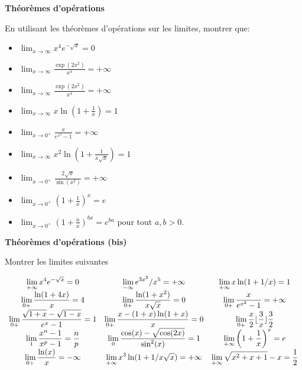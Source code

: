 \documentclass[a4paper,12pt]{article}
\newenvironment{disarray}%
 {\everymath{\displaystyle\everymath{}}\array}%
 {\endarray}
\begin{document}
\Exo \textbf{Théorèmes d'opérations}

En utilisant les théorèmes d'opérations sur les limites, montrer que:

\begin{itemize}
\item $\displaystyle \lim_{x \to \infty} x^4e^{-\sqrt{x}} = 0$
\item $\displaystyle \lim_{x \to \infty} \frac{\exp(2x^2)}{x^4} = +\infty$
\item $\displaystyle \lim_{x \to \infty} \frac{\exp(2x^2)}{x^4} = +\infty$
\item $\displaystyle \lim_{x \to \infty} x\ln\left(1 + \frac{1}{x}\right) = 1$
\item $\displaystyle \lim_{x \to 0^+} \frac{x}{e^{x^2} - 1} = +\infty$
\item $\displaystyle \lim_{x \to \infty}  x^2\ln\left(1 + \frac{1}{x\sqrt{x}}\right) = 1 $
\item $\displaystyle \lim_{x \to 0^+} \frac{2\sqrt{x}}{\sin(x^2)} = +\infty$
\item $\displaystyle \lim_{x \to 0^+} \left( 1 + \frac{1}{x}\right)^x = e$
\item $\displaystyle \lim_{x \to 0^+} \left( 1 + \frac{a}{x}\right)^{bx} = e^{ba}$ pour tout $a,b > 0$. 
\end{itemize}

\Exo \textbf{Théorèmes d'opérations (bis)}

Montrer les limites suivantes

\begin{equation*}
  \begin{disarray}{ccc}
    \lim_{+\infty} x^4 e^{-\sqrt{x}} = 0 & \lim_{-\infty} e^{3x^2}/x^5 = +\infty & \lim_{+\infty} x\ln(1 + 1/x) = 1\\
    \lim_{0+} \frac{\ln(1+4x)}{x} = 4 & \lim_{0+} \frac{\ln(1+x^2)}{x\sqrt{x}} = 0 & \lim_{0+} \frac{x}{e^{x^2} - 1} = +\infty \\
    \lim_{0+} \frac{\sqrt{1+x} - \sqrt{1-x}}{e^{x} - 1} = 1 & \lim_{0+} \frac{x - (1+x)\ln(1+x)}{x} = 0 & \lim_{0+} \frac{x}{2} \lfloor \frac{3}{x} \rfloor \frac{3}{2} \\
    \lim_{1} \frac{x^n - 1}{x^p - 1} = \frac{n}{p} & \lim_{0} \frac{\cos(x) - \sqrt{\cos(2x)}}{\sin^2(x)} = 1 & \lim_{+\infty} \left(1 + \frac{1}{x}\right)^x = e \\
    \lim_{0+} \frac{\ln(x)}{x} = -\infty & \lim_{+\infty} x^3\ln(1+ 1/x\sqrt{x}) = +\infty & \lim_{+\infty} \sqrt{x^2 + x + 1} - x = \frac{1}{2} \\
  \end{disarray}
\end{equation*}
\end{document}
